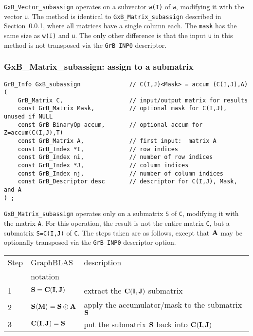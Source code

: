 \documentclass[12pt]{article}
\begin{document}
\verb'GxB_Vector_subassign' operates on a subvector \verb'w(I)' of \verb'w',
modifying it with the vector \verb'u'.  The method is identical to
\verb'GxB_Matrix_subassign' described in Section~\ref{subassign_matrix}, where
all matrices have a single column each.  The \verb'mask' has the same size as
\verb'w(I)' and \verb'u'.  The only other difference is that the input \verb'u'
in this method is not transposed via the \verb'GrB_INP0' descriptor.

\newpage
\subsubsection{{\sf GxB\_Matrix\_subassign:} assign to a submatrix }
\label{subassign_matrix}

\begin{mdframed}[userdefinedwidth=6in]
{\footnotesize
\begin{verbatim}
GrB_Info GxB_subassign              // C(I,J)<Mask> = accum (C(I,J),A)
(
    GrB_Matrix C,                   // input/output matrix for results
    const GrB_Matrix Mask,          // optional mask for C(I,J), unused if NULL
    const GrB_BinaryOp accum,       // optional accum for Z=accum(C(I,J),T)
    const GrB_Matrix A,             // first input:  matrix A
    const GrB_Index *I,             // row indices
    const GrB_Index ni,             // number of row indices
    const GrB_Index *J,             // column indices
    const GrB_Index nj,             // number of column indices
    const GrB_Descriptor desc       // descriptor for C(I,J), Mask, and A
) ;
\end{verbatim} } \end{mdframed}

\verb'GxB_Matrix_subassign' operates only on a submatrix \verb'S' of \verb'C',
modifying it with the matrix \verb'A'.   For this operation, the result is not
the entire matrix \verb'C', but a submatrix \verb'S=C(I,J)' of \verb'C'.  The
steps taken are as follows, except that ${\bf A}$ may be optionally transposed
via the \verb'GrB_INP0' descriptor option.

\vspace{0.1in}
\begin{tabular}{lll}
\hline
Step & GraphBLAS & description \\
     & notation  & \\
\hline
1 & ${\bf S} = {\bf C(I,J)}$                             & extract the ${\bf C(I,J)}$ submatrix \\
2 & ${\bf S \langle M \rangle} = {\bf S} \odot {\bf A}$  & apply the accumulator/mask to the submatrix ${\bf S}$\\
3 & ${\bf C(I,J)}= {\bf S}$                              & put the submatrix ${\bf S}$ back into ${\bf C(I,J)}$ \\ 
\hline
\end{tabular}
\vspace{0.1in}
\end{document}
